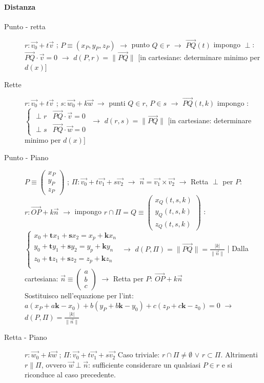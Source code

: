 \documentclass[10pt]{article}
\theoremstyle{plain}
\begin{document}
\paragraph{Distanza}
\begin{description}
\item[Punto - retta] $r: \Vec{v_0} + t \Vec{v}$ ; $P \equiv (x_P, y_P, z_P)$ $\rightarrow$ punto $Q \in r$ $\rightarrow$ $\Vec{PQ}(t)$ impongo $\perp$: $\Vec{PQ} \cdot \Vec{v} = 0$ $\rightarrow$ $d(P, r) = \lVert \Vec{PQ} \rVert$ [in cartesiane: determinare minimo per $d(x)$]
\item[Rette] $r: \Vec{v_0} + t \Vec{v}$ ; $s: \Vec{w_0} + k \Vec{w}$ $\rightarrow$ punti $Q \in r$, $P \in s$ $\rightarrow$ $\Vec{PQ}(t,k)$ impongo : $\begin{cases} \perp r & \Vec{PQ} \cdot \Vec{v} = 0 \\ \perp s & \Vec{PQ} \cdot \Vec{w} = 0 \end{cases}$ $\rightarrow$ $d(r, s) = \lVert \Vec{PQ} \rVert$ [in cartesiane: determinare minimo per $d(x)$]
\item[Punto - Piano] $P \equiv \begin{pmatrix}x_P\\ y_P\\ z_P\end{pmatrix}$ ; $\Pi : \Vec{v_0} + t \Vec{v_1} + s \Vec{v_2}$ $\rightarrow$ $\Vec{n} = \Vec{v_1} \times \Vec{v_2}$ $\rightarrow$ Retta $\perp$ per $P$: $r: \Vec{OP} + k \Vec{n}$ $\rightarrow$ impongo $r \cap \Pi = Q \equiv \begin{pmatrix}
    x_Q (t, s, k)\\ y_Q (t, s, k)\\ z_Q (t, s, k)
\end{pmatrix}$ : $\begin{cases}
    x_0 + \mathbf{t} x_1 + \mathbf{s} x_2 = x_p + \mathbf{k} x_n\\
    y_0 + \mathbf{t} y_1 + \mathbf{s} y_2 = y_p + \mathbf{k} y_n\\
    z_0 + \mathbf{t} z_1 + \mathbf{s} z_2 = z_p + \mathbf{k} z_n\\
\end{cases}$ $\rightarrow$ $d(P, \Pi) = \lVert \Vec{PQ} \rVert = \frac{|k|}{\lVert \Vec{n} \rVert}$ | Dalla cartesiana: $\Vec{n} \equiv \begin{pmatrix}
    a\\b\\c
\end{pmatrix}$ $\rightarrow$ Retta per $P$: $\Vec{OP} + k \Vec{n}$ \\Sostituisco nell'equazione per l'int: $a (x_P + a \mathbf{k} - x_0) + b (y_P + b \mathbf{k} - y_0) + c (z_P + c \mathbf{k} - z_0) = 0$ $\rightarrow$ $d(P, \Pi) = \frac{|k|}{\lVert \Vec{n} \rVert}$
\item[Retta - Piano]
$r: \Vec{w_0} + k \Vec{w}$ ; $\Pi : \Vec{v_0} + t \Vec{v_1} + s \Vec{v_2}$ Caso triviale: $r \cap \Pi \neq \emptyset$ $\lor$ $r \subset \Pi$. Altrimenti $r \| \Pi$, ovvero $\Vec{w} \perp \Vec{n}$: sufficiente considerare un qualsiasi $P \in r$ e si riconduce al caso precedente.
\end{description}
\end{document}
